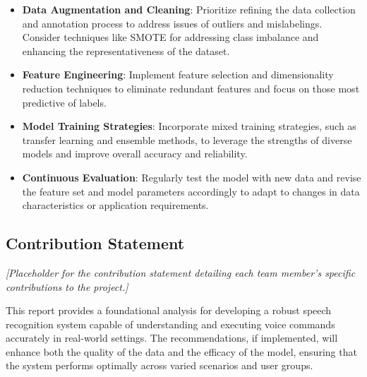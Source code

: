 \begin{itemize}
    \item \textbf{Data Augmentation and Cleaning}: Prioritize refining the data collection and annotation process to address issues of outliers and mislabelings. Consider techniques like SMOTE for addressing class imbalance and enhancing the representativeness of the dataset.
    \item \textbf{Feature Engineering}: Implement feature selection and dimensionality reduction techniques to eliminate redundant features and focus on those most predictive of labels.
    \item \textbf{Model Training Strategies}: Incorporate mixed training strategies, such as transfer learning and ensemble methods, to leverage the strengths of diverse models and improve overall accuracy and reliability.
    \item \textbf{Continuous Evaluation}: Regularly test the model with new data and revise the feature set and model parameters accordingly to adapt to changes in data characteristics or application requirements.
\end{itemize}

\subsection{Contribution Statement}

\textit{[Placeholder for the contribution statement detailing each team member’s specific contributions to the project.]}

This report provides a foundational analysis for developing a robust speech recognition system capable of understanding and executing voice commands accurately in real-world settings. The recommendations, if implemented, will enhance both the quality of the data and the efficacy of the model, ensuring that the system performs optimally across varied scenarios and user groups.
